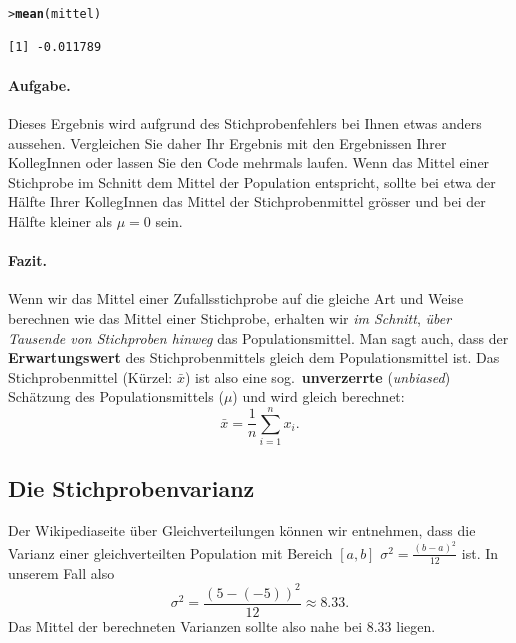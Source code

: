 \documentclass[oneside, 10pt]{book}\usepackage[]{graphicx}\usepackage[]{xcolor}
\makeatletter
\newcommand{\hlstd}[1]{\textcolor[rgb]{0.345,0.345,0.345}{#1}}%
\newcommand{\hlkwd}[1]{\textcolor[rgb]{0.737,0.353,0.396}{\textbf{#1}}}%
\newenvironment{kframe}{%
 \def\at@end@of@kframe{}%
 \ifinner\ifhmode%
  \def\at@end@of@kframe{\end{minipage}}%
  \begin{minipage}{\columnwidth}%
 \fi\fi%
 \def\FrameCommand##1{\hskip\@totalleftmargin \hskip-\fboxsep
 \colorbox{shadecolor}{##1}\hskip-\fboxsep
     \hskip-\linewidth \hskip-\@totalleftmargin \hskip\columnwidth}%
 \MakeFramed {\advance\hsize-\width
   \@totalleftmargin\z@ \linewidth\hsize
   \@setminipage}}%
 {\par\unskip\endMakeFramed%
 \at@end@of@kframe}
\newenvironment{knitrout}{}{} %
\makeatother
\begin{document}
\begin{knitrout}
\color{fgcolor}\begin{kframe}
\begin{alltt}
\hlstd{> }\hlkwd{mean}\hlstd{(mittel)}
\end{alltt}
\begin{verbatim}
[1] -0.011789
\end{verbatim}
\end{kframe}
\end{knitrout}

\paragraph{Aufgabe.}
Dieses Ergebnis wird aufgrund des Stichprobenfehlers bei Ihnen
etwas anders aussehen. Vergleichen Sie daher Ihr Ergebnis mit
den Ergebnissen Ihrer KollegInnen
oder lassen Sie den Code mehrmals
laufen. Wenn das Mittel einer Stichprobe im Schnitt dem
Mittel der Population entspricht, sollte bei etwa der Hälfte
Ihrer KollegInnen das Mittel der Stichprobenmittel grösser
und bei der Hälfte kleiner als $\mu = 0$ sein.

\paragraph{Fazit.}
Wenn wir das Mittel einer Zufallsstichprobe auf die gleiche Art
und Weise berechnen wie das Mittel einer Stichprobe, erhalten
wir \emph{im Schnitt}, \emph{über Tausende von Stichproben hinweg}
das Populationsmittel. Man sagt auch, dass der \textbf{Erwartungswert}
des Stichprobenmittels gleich dem Populationsmittel ist.
Das Stichprobenmittel (Kürzel: $\bar{x}$)
ist also eine sog.\ \textbf{unverzerrte} (\textit{unbiased}) Schätzung des
Populationsmittels ($\mu$) und wird gleich berechnet:
\begin{equation*}
\bar{x} = \frac{1}{n} \sum_{i = 1}^{n} x_i.
\end{equation*}

\subsection{Die Stichprobenvarianz}\label{sec:stichprobenvarianz}
Der Wikipediaseite über Gleichverteilungen
können wir entnehmen, dass
die Varianz einer gleichverteilten Population
mit Bereich $[a, b]$ $\sigma^2 = \frac{(b-a)^2}{12}$ ist.
In unserem Fall also 
\[
 \sigma^2 = \frac{(5-(-5))^2}{12} \approx 8.33.
\]
Das Mittel der berechneten Varianzen sollte also nahe bei 8.33 liegen.
\end{document}
